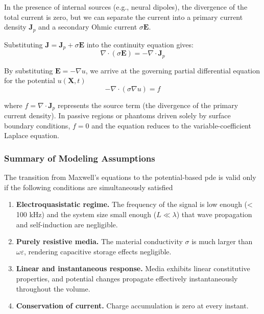 In the presence of internal sources (e.g., neural dipoles), the divergence of the total current is zero, but we can separate the current into a primary current density $\mathbf{J}_p$ and a secondary Ohmic current $\sigma \mathbf{E}$.

Substituting $\mathbf{J} = \mathbf{J}_p + \sigma \mathbf{E}$ into the continuity equation gives: $$\nabla \cdot (\sigma \mathbf{E}) = -\nabla \cdot \mathbf{J}_p$$

By substituting $\mathbf{E} = -\nabla u$, we arrive at the governing partial differential equation for the potential $u(\mathbf{X},t)$ 
$$-\nabla \cdot (\sigma \nabla u) = f$$

where $f = \nabla \cdot \mathbf{J}_p$ represents the source term (the divergence of the primary current density). In passive regions or phantoms driven solely by surface boundary conditions, $f = 0$ and the equation reduces to the variable-coefficient Laplace equation.

\subsubsection{Summary of Modeling Assumptions}
\label{subsubsec:modeling_assumptions}

The transition from Maxwell's equations to the potential-based \gls{pde} is valid only if the following conditions are simultaneously satisfied

\begin{enumerate}
    \item \textbf{Electroquasistatic regime.} The frequency of the signal is low enough (< 100 kHz) and the system size small enough ($L \ll \lambda$) that wave propagation and self-induction are negligible.
    \item \textbf{Purely resistive media.} The material conductivity $\sigma$ is much larger than $\omega\varepsilon$, rendering capacitive storage effects negligible.
    \item \textbf{Linear and instantaneous response.} Media exhibits linear constitutive properties, and potential changes propagate effectively instantaneously throughout the volume.
    \item \textbf{Conservation of current.} Charge accumulation is zero at every instant.
\end{enumerate}